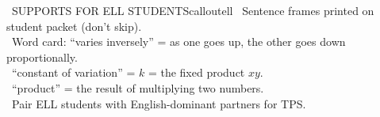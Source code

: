 \documentclass[11pt]{article}
\begin{document}
\begin{callout}{\IconGlobe\ SUPPORTS FOR ELL STUDENTS}{calloutell}
\textbullet\ Sentence frames printed on student packet (don't skip).\\
\textbullet\ Word card: ``varies inversely'' = as one goes up, the other goes down proportionally.\\
\textbullet\ ``constant of variation'' = \(k\) = the fixed product \(xy\).\\
\textbullet\ ``product'' = the result of multiplying two numbers.\\
\textbullet\ Pair ELL students with English-dominant partners for TPS.
\end{callout}
\end{document}
